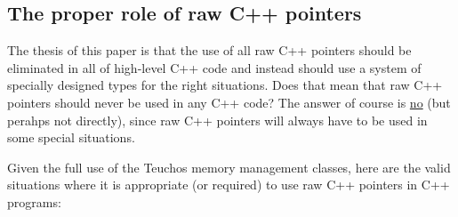 \documentclass[pdf,ps2pdf,11pt]{SANDreport}
\begin{document}
%
{}\subsection{The proper role of raw C++ pointers}
\label{sec:role-of-raw-pointers}
%

The thesis of this paper is that the use of all raw C++ pointers
should be eliminated in all of high-level C++ code and instead should
use a system of specially designed types for the right situations.
Does that mean that raw C++ pointers should never be used in any C++
code?  The answer of course is {}\underline{no} (but perahps not
directly), since raw C++ pointers will always have to be used in some
special situations.

Given the full use of the Teuchos memory management classes, here are
the valid situations where it is appropriate (or required) to use raw
C++ pointers in C++ programs:
\end{document}
